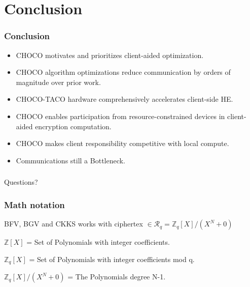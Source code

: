 \documentclass[10pt]{beamer}
\begin{document}
\section{Conclusion}
\begin{frame}
\frametitle{Conclusion}
\begin{itemize}
    \item CHOCO motivates and prioritizes client-aided optimization.
    \item CHOCO algorithm optimizations reduce communication by orders of magnitude over prior work.
\pause
    \item CHOCO-TACO hardware comprehensively accelerates client-side HE.
    \item CHOCO enables participation from resource-constrained devices in client-aided encryption computation.
\pause
    \item CHOCO makes client responsibility competitive with local compute.
    \item Communications still a Bottleneck.
\end{itemize}

\end{frame}


\begin{frame}
\frametitle{}
\Huge

\begin{center}
   Questions?
\end{center}
\end{frame}




\begin{frame}[noframenumbering]
\frametitle{Math notation}
BFV, BGV and CKKS works with ciphertex  $\in \mathcal{R}_q =\mathbb{Z}_q[X]/(X^N+0)$

$\mathbb{Z}[X]$ = Set of Polynomials with integer coefficients.

$\mathbb{Z}_q[X]$ = Set of Polynomials with integer coefficients mod q.

$\mathbb{Z}_q[X]/(X^N+0)$ = The Polynomials degree N-1.


\end{frame}
\end{document}
